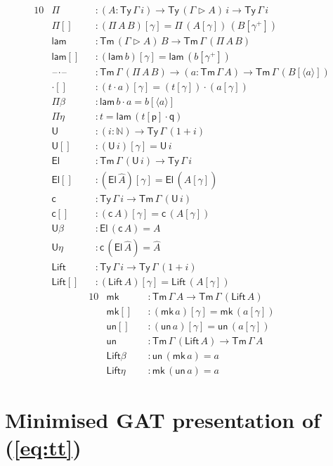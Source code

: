 \documentclass[a4paper,UKenglish,cleveref, autoref, thm-restate]{lipics-v2021}
\newcommand{\ra}{\rightarrow}
\newcommand{\Ty}{\mathsf{Ty}}
\newcommand{\Tm}{\mathsf{Tm}}
\newcommand{\p}{\mathsf{p}}
\newcommand{\q}{\mathsf{q}}
\newcommand{\ext}{\mathop{\triangleright}}
\newcommand{\N}{\mathbb{N}}
\newcommand{\lam}{\mathsf{lam}}
\newcommand{\U}{\mathsf{U}}
\newcommand{\El}{\mathsf{El}}
\newcommand{\cd}{\mathsf{c}}
\newcommand{\blank}{\mathord{\hspace{1pt}\text{--}\hspace{1pt}}} %
\newcommand{\Lift}{\mathsf{Lift}}
\newcommand{\mk}{\mathsf{mk}}
\newcommand{\un}{\mathsf{un}}
\begin{document}
\begin{alignat*}{10}
  & \Pi && : (A:\Ty\,\Gamma\,i)\ra\Ty\,(\Gamma\ext A)\,i\ra\Ty\,\Gamma\,i \\
  & \Pi[] && : (\Pi\,A\,B)[\gamma] = \Pi\,(A[\gamma])\,(B[\gamma^+]) \\
  & \lam && : \Tm\,(\Gamma\ext A)\,B\ra\Tm\,\Gamma\,(\Pi\,A\,B) \\
  & \lam[] && : (\lam\,b)[\gamma] = \lam\,(b[\gamma^+]) \\
  & \blank\cdot\blank && : \Tm\,\Gamma\,(\Pi\,A\,B)\ra(a:\Tm\,\Gamma\,A)\ra\Tm\,\Gamma\,(B[\langle a\rangle]) \\
  & {\cdot}[] && : (t\cdot a)[\gamma] = (t[\gamma])\cdot(a[\gamma]) \\
  & \Pi\beta && : \lam\,b\cdot a = b[\langle a\rangle] \\
  & \Pi\eta && : t = \lam\,(t[\p]\cdot\q) \\
  & \U && : (i:\N)\ra\Ty\,\Gamma\,(1+i) \\
  & \U[] && : (\U\,i)[\gamma] = \U\,i \\  
  & \El && : \Tm\,\Gamma\,(\U\,i) \ra \Ty\,\Gamma\,i \\
  & \El[] && : (\El\,\hat{A})[\gamma] = \El\,(\hat{A}[\gamma]) \\
  & \cd && : \Ty\,\Gamma\,i\ra\Tm\,\Gamma\,(\U\,i) \\
  & \cd[] && : (\cd\,A)[\gamma] = \cd\,(A[\gamma]) \\
  & \U\beta && : \El\,(\cd\,A) = A \\
  & \U\eta && : \cd\,(\El\,\hat{A}) = \hat{A} \\
  & \Lift && : \Ty\,\Gamma\,i\ra\Ty\,\Gamma\,(1+i) \\
  & \Lift[] && : (\Lift\,A)[\gamma] = \Lift\,(A[\gamma])
\end{alignat*}
\begin{alignat*}{10}
  & \mk && : \Tm\,\Gamma\,A \ra \Tm\,\Gamma\,(\Lift\,A) \\
  & \mk[] && : (\mk\,a)[\gamma] = \mk\,(a[\gamma]) \\
  & \un[] && : (\un\,a)[\gamma] = \un\,(a[\gamma]) \\
  & \un && : \Tm\,\Gamma\,(\Lift\,A) \ra \Tm\,\Gamma\,A \\
  & \Lift\beta && : \un\,(\mk\,a) = a \\
  & \Lift\eta && : \mk\,(\un\,a) = a
\end{alignat*}

\section{Minimised GAT presentation of (\ref{eq:tt})}
\label{app:minimisation}
\end{document}
